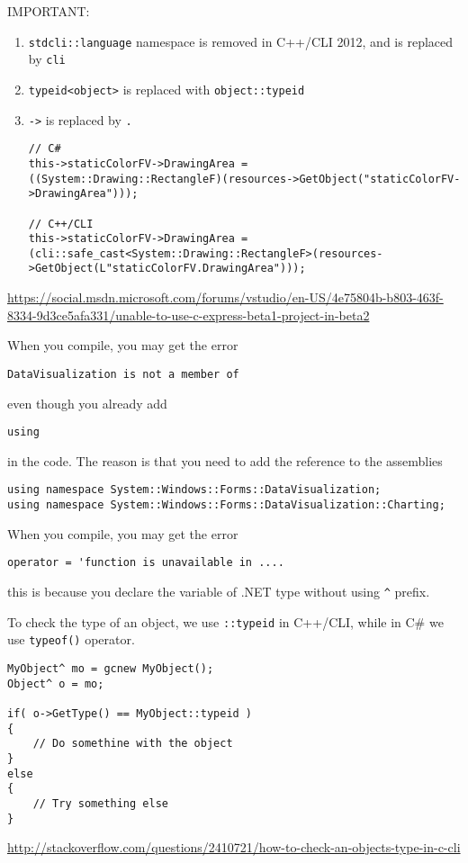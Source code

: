 IMPORTANT: 
\begin{enumerate}
  \item \verb!stdcli::language! namespace is removed in C++/CLI 2012, and is
  replaced by \verb!cli!
  \item \verb!typeid<object>! is replaced with \verb!object::typeid!
  \item \verb!->! is replaced by \verb!.!

\begin{verbatim}
// C#
this->staticColorFV->DrawingArea =
((System::Drawing::RectangleF)(resources->GetObject("staticColorFV->DrawingArea")));

// C++/CLI
this->staticColorFV->DrawingArea =
(cli::safe_cast<System::Drawing::RectangleF>(resources->GetObject(L"staticColorFV.DrawingArea")));
\end{verbatim}  
\end{enumerate}
\url{https://social.msdn.microsoft.com/forums/vstudio/en-US/4e75804b-b803-463f-8334-9d3ce5afa331/unable-to-use-c-express-beta1-project-in-beta2}

When you compile, you may get the error
\begin{verbatim}
DataVisualization is not a member of 
\end{verbatim}
even though you already add
\begin{verbatim}
using
\end{verbatim}
in the code. The reason is that you need to add the reference to the assemblies
\begin{verbatim}
using namespace System::Windows::Forms::DataVisualization;
using namespace System::Windows::Forms::DataVisualization::Charting;
\end{verbatim}

When you compile, you may get the error
\begin{verbatim}
operator = 'function is unavailable in ....
\end{verbatim}
this is because you declare the variable of .NET type without using \verb!^!
prefix.

To check the type of an object, we use \verb!::typeid! in C++/CLI, while in C\#
we use \verb!typeof()! operator.
\begin{verbatim}
MyObject^ mo = gcnew MyObject();
Object^ o = mo;

if( o->GetType() == MyObject::typeid )
{
    // Do somethine with the object
}
else
{
    // Try something else
}
\end{verbatim}
\url{http://stackoverflow.com/questions/2410721/how-to-check-an-objects-type-in-c-cli}

